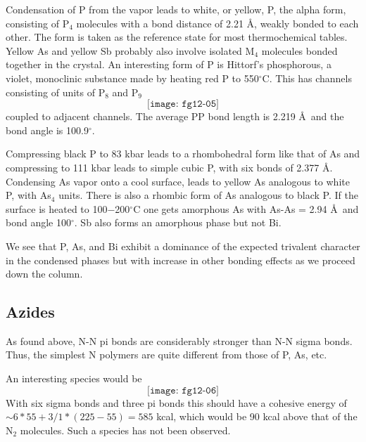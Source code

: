 Condensation of P from the vapor leads to white, or yellow, P, the 
alpha form, consisting of P$_4$ molecules with a bond distance of 
2.21 \AA, weakly bonded to each other.  The form is taken as the
reference state for most thermochemical tables.  Yellow As and yellow Sb 
probably also involve isolated M$_4$ molecules bonded together in the 
crystal.  An interesting form of P is Hittorf's phosphorous, a violet, 
monoclinic substance made by heating red P to 550$^{\circ}$C.  This has 
channels consisting of units of P$_8$ and P$_9$ 
\begin{equation}
\texttt{[image: fg12-05]}
\end{equation}
coupled to adjacent channels.  The average PP bond length is 2.219 \AA\ and the 
bond angle is 100.9$^{\circ}$.

Compressing black P to 83 kbar leads to a rhombohedral form like that of As 
and compressing to 111 kbar leads to simple cubic P, with six bonds of 
2.377 \AA.  Condensing As vapor onto a cool surface, leads to yellow As 
analogous to white P, with As$_4$ units.  There is also a rhombic form of 
As analogous to black P.  If the surface is heated to 100$-$200$^{\circ}$C one
gets amorphous As with As-As = 2.94 \AA\ and bond angle 100$^{\circ}$.
Sb also forms an amorphous phase but not Bi.

We see that P, As, and Bi exhibit a dominance of the expected trivalent 
character in the condensed phases but with increase in other bonding 
effects as we proceed down the column.

\subsection{Azides}

As found above, N-N pi bonds are considerably stronger than N-N sigma 
bonds.  Thus, the simplest N
polymers are quite different from those of P, As, etc.

An interesting species would be
\begin{equation}
\texttt{[image: fg12-06]}
\end{equation}
With six sigma bonds and three pi bonds this should have a cohesive energy of
$\sim 6 * 55 + 3/1 * (225 - 55) = 585$ kcal, which would be 90 kcal above 
that of the N$_2$ molecules.  Such a species has not been observed.

